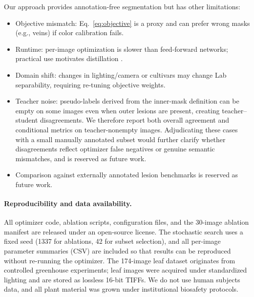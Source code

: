 \documentclass[11pt,a4paper]{article}
\begin{document}
Our approach provides annotation-free segmentation but has other limitations:
\begin{itemize}
    \item Objective mismatch: Eq.~\eqref{eq:objective} is a proxy and can prefer wrong masks (e.g., veins) if color calibration fails.
    \item Runtime: per-image optimization is slower than feed-forward networks; practical use motivates distillation \citep{hinton2015distilling}.
    \item Domain shift: changes in lighting/camera or cultivars may change Lab separability, requiring re-tuning objective weights.
    \item Teacher noise: pseudo-labels derived from the inner-mask definition can be empty on some images even when outer lesions are present, creating teacher--student disagreements. We therefore report both overall agreement and conditional metrics on teacher-nonempty images. Adjudicating these cases with a small manually annotated subset would further clarify whether disagreements reflect optimizer false negatives or genuine semantic mismatches, and is reserved as future work.
    \item Comparison against externally annotated lesion benchmarks is reserved as future work.
\end{itemize}

\paragraph{Reproducibility and data availability.}
All optimizer code, ablation scripts, configuration files, and the 30-image ablation manifest are released under an open-source license. The stochastic search uses a fixed seed (1337 for ablations, 42 for subset selection), and all per-image parameter summaries (CSV) are included so that results can be reproduced without re-running the optimizer. The 174-image leaf dataset originates from controlled greenhouse experiments; leaf images were acquired under standardized lighting and are stored as lossless 16-bit TIFFs. We do not use human subjects data, and all plant material was grown under institutional biosafety protocols.

\end{document}
